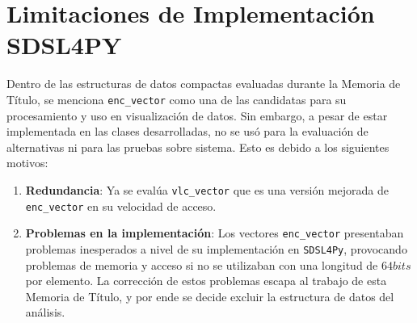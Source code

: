 





\chapter{Limitaciones de Implementación SDSL4PY}
\label{limitaciones_enc_vector}
Dentro de las estructuras de datos compactas evaluadas durante la Memoria de Título, se menciona \texttt{enc\_vector} como una de las candidatas para su procesamiento y uso en visualización de datos. Sin embargo, a pesar de estar implementada en las clases desarrolladas, no se usó para la evaluación de alternativas ni para las pruebas sobre sistema. Esto es debido a los siguientes motivos:

\begin{enumerate}
    \item \textbf{Redundancia}: Ya se evalúa \texttt{vlc\_vector} que es una versión mejorada de \texttt{enc\_vector} en su velocidad de acceso.
    \item \textbf{Problemas en la implementación}: Los vectores \texttt{enc\_vector} presentaban problemas inesperados a nivel de su implementación en \texttt{SDSL4Py}, provocando problemas de memoria y acceso si no se utilizaban con una longitud de $64 bits$ por elemento. La corrección de estos problemas escapa al trabajo de esta Memoria de Título, y por ende se decide excluir la estructura de datos del análisis.  
\end{enumerate}